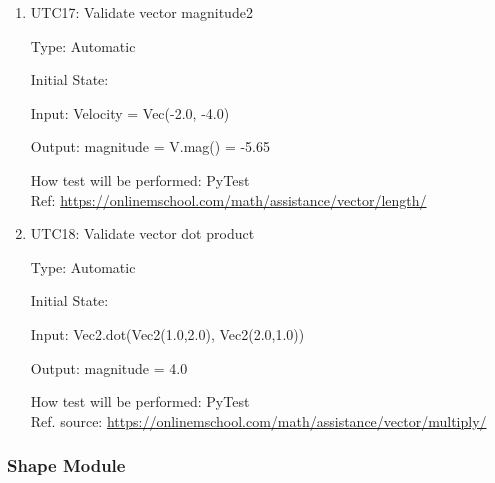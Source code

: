 \documentclass[12pt, titlepage]{article}
\begin{document}
\begin{enumerate}
	\item{UTC17}{: Validate vector magnitude2\\}
	
	Type: Automatic
	
	Initial State: 
	
	Input: Velocity = Vec(-2.0, -4.0)
	
	Output: magnitude = V.mag() = -5.65
	
	How test will be performed: PyTest\\
	Ref: \url{https://onlinemschool.com/math/assistance/vector/length/}
	\item{UTC18}{: Validate vector dot product\\}
	
	Type: Automatic
	
	Initial State: 
	
	Input: Vec2.dot(Vec2(1.0,2.0), Vec2(2.0,1.0))
	
	Output: magnitude = 4.0
	
	How test will be performed: PyTest\\
	Ref. source: \url{https://onlinemschool.com/math/assistance/vector/multiply/}
	
	
\end{enumerate}

\subsubsection{Shape Module}
\end{document}
